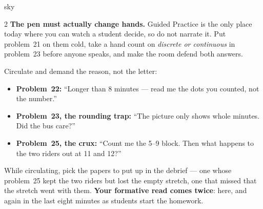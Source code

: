 \documentclass[10pt]{article}
\begin{document}
\begin{skillbox}{sky}
\begin{multicols}{2}
\textbf{The pen must actually change hands.} Guided Practice is the only place today where you
can watch a student decide, so do not narrate it. Put problem~21 on them cold, take a hand count
on \emph{discrete or continuous} in problem~23 before anyone speaks, and make the room defend
both answers.

Circulate and demand the reason, not the letter:
\begin{itemize}[leftmargin=1.1em, nosep]
  \item \textbf{Problem~22:} ``Longer than 8 minutes --- read me the dots you counted, not the
        number.''
  \item \textbf{Problem~23, the rounding trap:} ``The picture only shows whole minutes. Did the
        bus care?''
  \item \textbf{Problem~25, the crux:} ``Count me the 5--9 block. Then what happens to the two
        riders out at 11 and 12?''
\end{itemize}
While circulating, pick the papers to put up in the debrief --- one whose problem~25 kept the
two riders but lost the empty stretch, one that missed that the stretch went with them.
\textbf{Your formative read comes twice}: here, and again in the last eight minutes as students
start the homework.
\end{multicols}
\end{skillbox}
\end{document}
